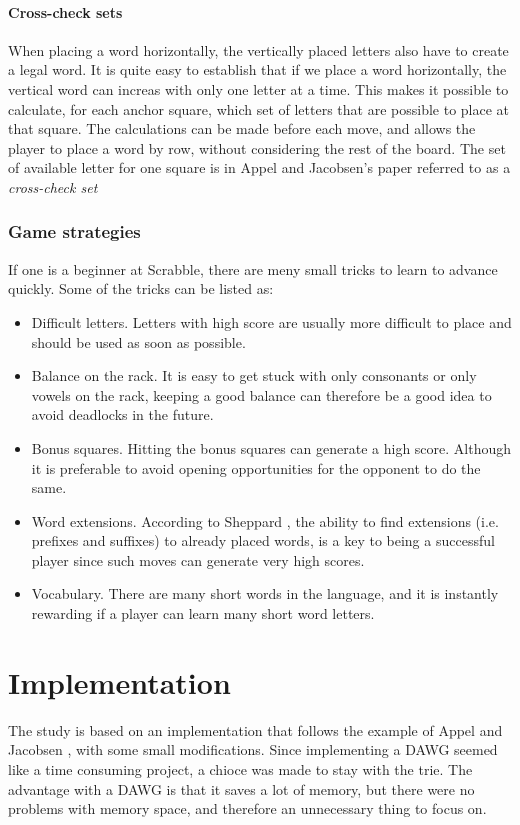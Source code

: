 \documentclass[a4paper, 12pt]{report}
\begin{document}
\subsubsection{Cross-check sets}
When placing a word horizontally, the vertically placed letters also have to create a legal word. It is quite easy to establish that if we place a word horizontally, the vertical word can increas with only one letter at a time. This makes it possible to calculate, for each anchor square, which set of letters that are possible to place at that square. The calculations can be made before each move, and allows the player to place a word by row, without considering the rest of the board. The set of available letter for one square is in Appel and Jacobsen's paper \cite{fastest} referred to as a \emph{cross-check set}

\subsection{Game strategies}
\label{sec:strategies}
If one is a beginner at Scrabble, there are meny small tricks to learn to advance quickly. Some of the tricks can be listed as:

\begin{itemize}
\item Difficult letters. Letters with high score are usually more difficult to place and should be used as soon as possible.
\item Balance on the rack. It is easy to get stuck with only consonants or only vowels on the rack, keeping a good balance can therefore be a good idea to avoid deadlocks in the future.
\item Bonus squares. Hitting the bonus squares can generate a high score. Although it is preferable to avoid opening opportunities for the opponent to do the same.
\item Word extensions. According to Sheppard \cite{perfectgame}, the ability to find extensions (i.e. prefixes and suffixes) to already placed words, is a key to being a successful player since such moves can generate very high scores.
\item Vocabulary. There are many short words in the language, and it is instantly rewarding if a player can learn many short word letters.
\end{itemize}






\chapter{Implementation}
The study is based on an implementation that follows the example of Appel and Jacobsen \cite{fastest}, with some small modifications. Since implementing a DAWG seemed like a time consuming project, a chioce was made to stay with the trie. The advantage with a DAWG is that it saves a lot of memory, but there were no problems with memory space, and therefore an unnecessary thing to focus on.
\end{document}
